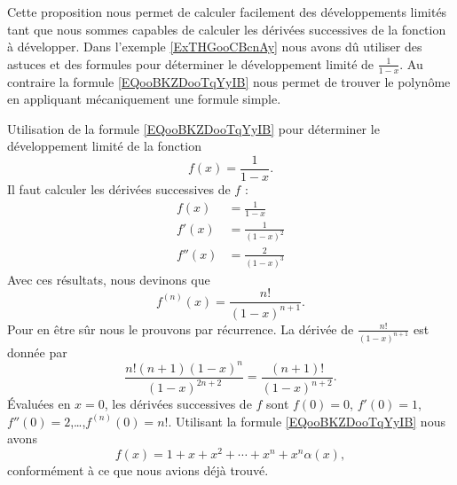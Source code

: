 Cette proposition nous permet de calculer facilement des développements limités tant que nous sommes capables de calculer les dérivées successives de la fonction à développer. Dans l'exemple \ref{ExTHGooCBcnAy} nous avons dû utiliser des astuces et des formules pour déterminer le développement limité de \( \frac{1}{ 1-x }\). Au contraire la formule \eqref{EQooBKZDooTqYyIB} nous permet de trouver le polynôme en appliquant mécaniquement une formule simple.

\begin{example}
	Utilisation de la formule \eqref{EQooBKZDooTqYyIB} pour déterminer le développement limité de la fonction
	\begin{equation}
		f(x)=\frac{1}{ 1-x }.
	\end{equation}
	Il faut calculer les dérivées successives de \( f\) :
	\begin{subequations}
		\begin{align}
			f(x)   & =\frac{1}{ 1-x }       \\
			f'(x)  & =\frac{ 1 }{ (1-x)^2 } \\
			f''(x) & =\frac{ 2 }{ (1-x)^3 }
		\end{align}
	\end{subequations}
	Avec ces résultats, nous devinons que
	\begin{equation}
		f^{(n)}(x)=\frac{ n! }{ (1-x)^{n+1} }.
	\end{equation}
	Pour en être sûr nous le prouvons par récurrence. La dérivée de \(\frac{ n! }{ (1-x)^{n+1} } \) est donnée par
	\begin{equation}
		\frac{ n!(n+1)(1-x)^n }{ (1-x)^{2n+2} }=\frac{(n+1)! }{ (1-x)^{n+2} }.
	\end{equation}
	Évaluées en \( x=0\), les dérivées successives de \( f\) sont \( f(0)=0\), \( f'(0)=1\), \( f''(0)=2\),\ldots,\( f^{(n)}(0)=n!\). Utilisant la formule \eqref{EQooBKZDooTqYyIB} nous avons
	\begin{equation}
		f(x)=1+x+x^2+\cdots +x^n+x^n\alpha(x),
	\end{equation}
	conformément à ce que nous avions déjà trouvé.
\end{example}

